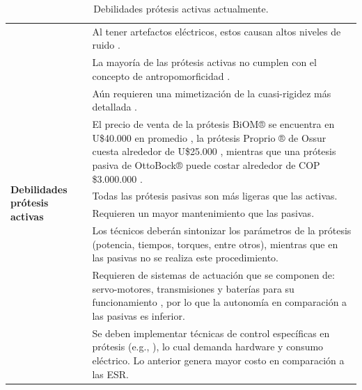 \documentclass[12pt,english]{article}
\providecommand{\tabularnewline}{\\}
\begin{document}
\begin{center}
\begin{table}[H]


\caption{\label{tab:Debilidades-pr=0000F3tesis-activas}Debilidades prótesis
activas actualmente.}


\begin{tabular}{|l|>{\centering}p{15cm}|}
\hline 
\multirow{9}{*}[-10mm]{\begin{turn}{90}
\textbf{Debilidades prótesis activas}
\end{turn}} & \centering{}Al tener artefactos eléctricos, estos causan altos niveles
de ruido \cite{boston}.\tabularnewline
\cline{2-2} 
 & \centering{}La mayoría de las prótesis activas no cumplen con el concepto
de antropomorficidad \cite{BIOMASME}.\tabularnewline
\cline{2-2} 
 & Aún requieren una mimetización de la cuasi-rigidez más detallada \cite{Hill2013a}.\tabularnewline
\cline{2-2} 
 & El precio de venta de la prótesis BiOM® se encuentra en U\$40.000
en promedio \cite{boston}, la prótesis Proprio ® de Ossur cuesta alrededor
de U\$25.000 \cite{bloomberg}, mientras que una prótesis pasiva de
OttoBock® puede costar alrededor de COP \$3.000.000 \cite{Prieto2014}.\tabularnewline
\cline{2-2} 
 & Todas las prótesis pasivas son más ligeras que las activas.\tabularnewline
\cline{2-2} 
 & Requieren un mayor mantenimiento que las pasivas.\tabularnewline
\cline{2-2} 
 & Los técnicos deberán sintonizar los parámetros de la prótesis (potencia,
tiempos, torques, entre otros), mientras que en las pasivas no se
realiza este procedimiento.\tabularnewline
\cline{2-2} 
 & Requieren de sistemas de actuación que se componen de: servo-motores,
transmisiones y baterías para su funcionamiento \cite{boston}, por
lo que la autonomía en comparación a las pasivas es inferior.\tabularnewline
\cline{2-2} 
 & Se deben implementar técnicas de control específicas en prótesis (e.g.,
\cite{Reis2016}), lo cual demanda hardware y consumo eléctrico. Lo
anterior genera mayor costo en comparación a las ESR.\tabularnewline
\hline 
\end{tabular}

\end{table}

\par\end{center}
\end{document}
